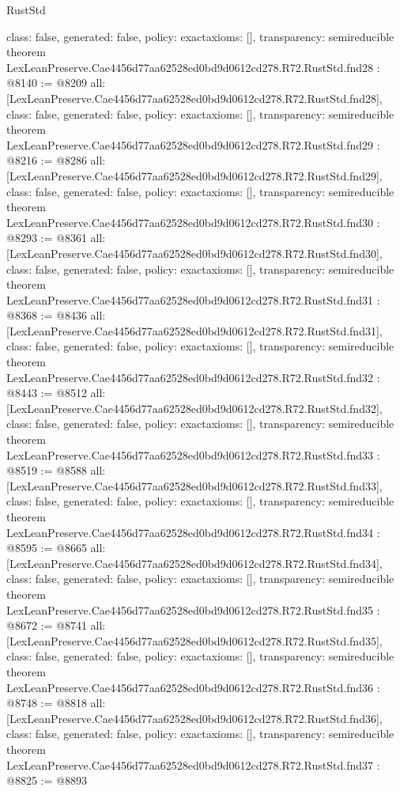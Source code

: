 \begin{lexlean}{RustStd}
\begin{coremodule}
{  class: false,
  generated: false,
  policy: exact{axioms: []},
  transparency: semireducible
}
theorem LexLeanPreserve.Cae4456d77aa62528ed0bd9d0612cd278.R72.RustStd.fnd28 : @8140 := @8209 {
  all: [LexLeanPreserve.Cae4456d77aa62528ed0bd9d0612cd278.R72.RustStd.fnd28],
  class: false,
  generated: false,
  policy: exact{axioms: []},
  transparency: semireducible
}
theorem LexLeanPreserve.Cae4456d77aa62528ed0bd9d0612cd278.R72.RustStd.fnd29 : @8216 := @8286 {
  all: [LexLeanPreserve.Cae4456d77aa62528ed0bd9d0612cd278.R72.RustStd.fnd29],
  class: false,
  generated: false,
  policy: exact{axioms: []},
  transparency: semireducible
}
theorem LexLeanPreserve.Cae4456d77aa62528ed0bd9d0612cd278.R72.RustStd.fnd30 : @8293 := @8361 {
  all: [LexLeanPreserve.Cae4456d77aa62528ed0bd9d0612cd278.R72.RustStd.fnd30],
  class: false,
  generated: false,
  policy: exact{axioms: []},
  transparency: semireducible
}
theorem LexLeanPreserve.Cae4456d77aa62528ed0bd9d0612cd278.R72.RustStd.fnd31 : @8368 := @8436 {
  all: [LexLeanPreserve.Cae4456d77aa62528ed0bd9d0612cd278.R72.RustStd.fnd31],
  class: false,
  generated: false,
  policy: exact{axioms: []},
  transparency: semireducible
}
theorem LexLeanPreserve.Cae4456d77aa62528ed0bd9d0612cd278.R72.RustStd.fnd32 : @8443 := @8512 {
  all: [LexLeanPreserve.Cae4456d77aa62528ed0bd9d0612cd278.R72.RustStd.fnd32],
  class: false,
  generated: false,
  policy: exact{axioms: []},
  transparency: semireducible
}
theorem LexLeanPreserve.Cae4456d77aa62528ed0bd9d0612cd278.R72.RustStd.fnd33 : @8519 := @8588 {
  all: [LexLeanPreserve.Cae4456d77aa62528ed0bd9d0612cd278.R72.RustStd.fnd33],
  class: false,
  generated: false,
  policy: exact{axioms: []},
  transparency: semireducible
}
theorem LexLeanPreserve.Cae4456d77aa62528ed0bd9d0612cd278.R72.RustStd.fnd34 : @8595 := @8665 {
  all: [LexLeanPreserve.Cae4456d77aa62528ed0bd9d0612cd278.R72.RustStd.fnd34],
  class: false,
  generated: false,
  policy: exact{axioms: []},
  transparency: semireducible
}
theorem LexLeanPreserve.Cae4456d77aa62528ed0bd9d0612cd278.R72.RustStd.fnd35 : @8672 := @8741 {
  all: [LexLeanPreserve.Cae4456d77aa62528ed0bd9d0612cd278.R72.RustStd.fnd35],
  class: false,
  generated: false,
  policy: exact{axioms: []},
  transparency: semireducible
}
theorem LexLeanPreserve.Cae4456d77aa62528ed0bd9d0612cd278.R72.RustStd.fnd36 : @8748 := @8818 {
  all: [LexLeanPreserve.Cae4456d77aa62528ed0bd9d0612cd278.R72.RustStd.fnd36],
  class: false,
  generated: false,
  policy: exact{axioms: []},
  transparency: semireducible
}
theorem LexLeanPreserve.Cae4456d77aa62528ed0bd9d0612cd278.R72.RustStd.fnd37 : @8825 := @8893 {
}
\end{coremodule}
\end{lexlean}
